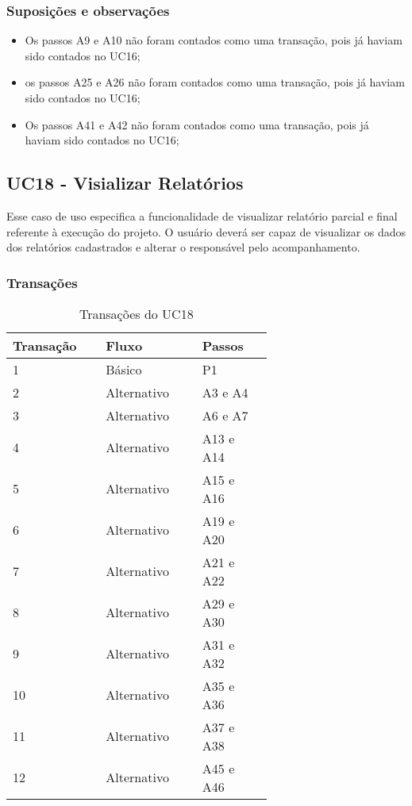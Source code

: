   \subsubsection{Suposições e observações}
  
  \begin{itemize}
   \item Os passos A9 e A10 não foram contados como uma transação, pois já haviam sido contados no UC16;	
   \item os passos A25 e A26 não foram contados como uma transação, pois já haviam sido contados no UC16;	
   \item Os passos A41 e A42 não foram contados como uma transação, pois já haviam sido contados no UC16;
  \end{itemize}
  
  \vfill
  
  
  
  \pagebreak
\subsection{UC18 - Visializar Relatórios}
  
  Esse caso de uso especifica a funcionalidade de visualizar relatório parcial e final referente à execução do projeto.
  O usuário deverá ser capaz de visualizar os dados dos relatórios cadastrados e alterar o responsável pelo acompanhamento.

  \subsubsection{Transações}

  \begin{table*}[!h]
  \centering
  \caption{Transações do UC18	}
  \label{uc17_transactions}
    \begin{tabular}{|p{0.20\linewidth}|p{0.25\linewidth}|p{0.20\linewidth}|}
    \hline
    \textbf{Transação} & \textbf{Fluxo} & \textbf{Passos} \\ 
    \hline
    1 & Básico & P1\\
    \hline
    2 & Alternativo & A3 e A4\\
    \hline
    3 & Alternativo & A6 e A7\\
    \hline
    4 & Alternativo & A13 e A14\\
    \hline
    5 & Alternativo & A15 e A16\\
    \hline
    6 & Alternativo & A19 e A20\\
    \hline
    7 & Alternativo & A21 e A22\\
    \hline
    8 & Alternativo & A29 e A30\\
      \hline
    9 & Alternativo & A31 e A32\\
      \hline
    10 & Alternativo & A35 e A36\\
      \hline
    11 & Alternativo & A37 e A38\\
      \hline
    12 & Alternativo & A45 e A46\\
    \hline
    \end{tabular}
  \end{table*}

